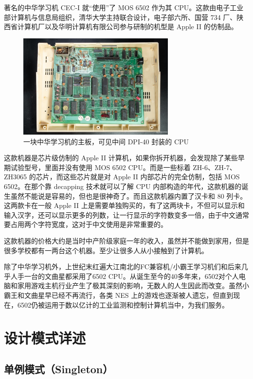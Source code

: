 \documentclass[cn,black,12pt,normal]{elegantnote}
\begin{document}
著名的中华学习机 CEC-I 就“使用”了 MOS 6502 作为其 CPU。这款由电子工业部计算机与信息局组织，清华大学主持联合设计，电子部六所、国营 734 厂、陕西省计算机厂以及华明计算机有限公司参与研制的机型是 Apple II 的仿制品。

\begin{figure}[H]
  \centering
  \includegraphics[width=0.7\textwidth]{image/CIC1.jpeg}
  \caption{一块中华学习机的主板，可见中间 DPI-40 封装的 CPU}
\end{figure}

这款机器是芯片级仿制的 Apple II 计算机，如果你拆开机器，会发现除了某些早期试验型号，里面并没有使用 MOS 6502 CPU。而是一些标着 ZH-6、ZH-7、ZH3065 的芯片，而这些芯片就是对 Apple II 内部芯片的完全仿制，包括 MOS 6502。在那个靠 decapping 技术就可以了解 CPU 内部构造的年代，这款机器的诞生虽然不能说是容易的，但也是很神奇了。而且这款机器内置了汉卡和 80 列卡。这两款卡在一般 Apple II 上是需要单独购买的，有了这两块卡，不但可以显示和输入汉字，还可以显示更多的列数，让一行显示的字符数变多一倍，由于中文通常要占用两个字符宽度，这对于中文使用是非常重要的。

这款机器的价格大约是当时中产阶级家庭一年的收入，虽然并不能做到家用，但是很多学校都有一两台这个机器。至少让很多人从小接触到了计算机。

除了中华学习机外，上世纪末红遍大江南北的FC兼容机/小霸王学习机们和后来几乎人手一台的文曲星都采用了6502 CPU。从诞生至今的40多年来，6502对个人电脑和家用游戏主机行业产生了极其深刻的影响，无数人的人生因此而改变。虽然小霸王和文曲星早已经不再流行，各类 NES 上的游戏也逐渐被人遗忘，但直到现在，6502仍被运用于数以亿计的工业监测和控制计算机当中，为我们服务。

\newpage

\section{设计模式详述}

\subsection{单例模式（Singleton）}
\end{document}
